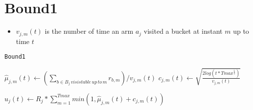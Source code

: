 \section{Bound1}
\begin{itemize}
	\item $v_{j,m}(t)$ is the number of time an arm $a_j$ visited a bucket at instant $m$ up to time $t$
	
\end{itemize}
\begin{algorithm}[!h]
	\caption{\texttt{Bound1}}
	\begin{scriptsize}
		\begin{algorithmic}[1]
			
			
	
			
				
				\State$\hat{\mu}_{j,m}(t)  \gets (\sum_{b \in B_j\, visistable\, up \,to\, m}{}{r_{b,m}})/ v_{j,m}(t)$\;
				\State$c_{j,m}(t)\gets  \sqrt{\frac{2log(t*Tmax^{\frac{1}{4}})}{v_{j,m}(t)}}$\;
			
			\EndFor		
			
			\State $u_j(t) \gets  R_j *\sum_{m=1}^{Tmax} min(1,\hat{\mu}_{j,m}(t)+c_{j,m}(t)) $\;	
			\EndFor
			
	
			
			
			\EndFunction
			
		\end{algorithmic}
	\end{scriptsize}
	\label{alg:Bound1}
\end{algorithm}

\fi
